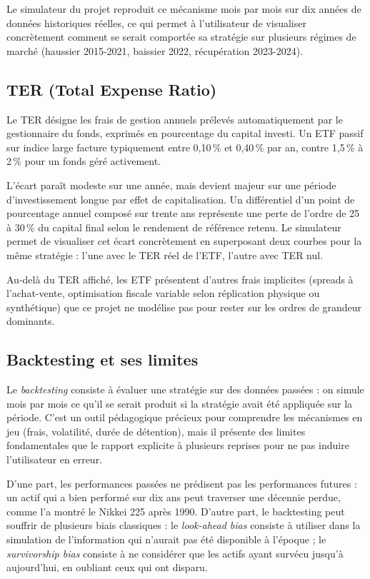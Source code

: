 \documentclass[11pt,a4paper]{article}
\begin{document}
Le simulateur du projet reproduit ce mécanisme mois par mois sur dix
années de données historiques réelles, ce qui permet à l'utilisateur de
visualiser concrètement comment se serait comportée sa stratégie sur
plusieurs régimes de marché (haussier 2015-2021, baissier 2022,
récupération 2023-2024).

\subsection{TER (Total Expense Ratio)}

Le TER désigne les frais de gestion annuels prélevés automatiquement
par le gestionnaire du fonds, exprimés en pourcentage du capital
investi. Un ETF passif sur indice large facture typiquement entre
0{,}10\,\% et 0{,}40\,\% par an, contre 1{,}5\,\% à 2\,\% pour un fonds
géré activement.

L'écart paraît modeste sur une année, mais devient majeur sur une
période d'investissement longue par effet de capitalisation. Un
différentiel d'un point de pourcentage annuel composé sur trente ans
représente une perte de l'ordre de 25 à 30\,\% du capital final selon
le rendement de référence retenu. Le simulateur permet de visualiser
cet écart concrètement en superposant deux courbes pour la même
stratégie : l'une avec le TER réel de l'ETF, l'autre avec TER nul.

Au-delà du TER affiché, les ETF présentent d'autres frais implicites
(spreads à l'achat-vente, optimisation fiscale variable selon
réplication physique ou synthétique) que ce projet ne modélise pas pour
rester sur les ordres de grandeur dominants.

\subsection{Backtesting et ses limites}

Le \textit{backtesting} consiste à évaluer une stratégie sur des
données passées : on simule mois par mois ce qu'il se serait produit si
la stratégie avait été appliquée sur la période. C'est un outil
pédagogique précieux pour comprendre les mécanismes en jeu (frais,
volatilité, durée de détention), mais il présente des limites
fondamentales que le rapport explicite à plusieurs reprises pour ne pas
induire l'utilisateur en erreur.

D'une part, les performances passées ne prédisent pas les performances
futures : un actif qui a bien performé sur dix ans peut traverser une
décennie perdue, comme l'a montré le Nikkei 225 après 1990. D'autre
part, le backtesting peut souffrir de plusieurs biais classiques : le
\textit{look-ahead bias} consiste à utiliser dans la simulation de
l'information qui n'aurait pas été disponible à l'époque ; le
\textit{survivorship bias} consiste à ne considérer que les actifs
ayant survécu jusqu'à aujourd'hui, en oubliant ceux qui ont disparu.
\end{document}
